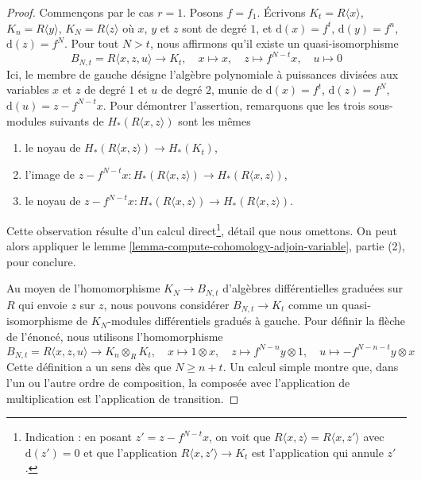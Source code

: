 \begin{proof}
Commençons par le cas $r = 1$. Posons $f = f_1$.
Écrivons $K_t = R\langle x \rangle$,
$K_n = R\langle y \rangle$, $K_N = R\langle z \rangle$
où $x$, $y$ et $z$ sont de degré $1$, et
$\text{d}(x) = f^t$, $\text{d}(y) = f^n$,
$\text{d}(z) = f^N$. Pour tout $N > t$, nous affirmons qu'il existe un quasi-isomorphisme
$$
B_{N, t} = R\langle x, z, u \rangle
\longrightarrow
K_t,\quad
x \mapsto x,\quad
z \mapsto f^{N - t}x,\quad
u \mapsto 0
$$
Ici, le membre de gauche désigne l'algèbre polynomiale à puissances divisées
aux variables $x$ et $z$ de degré $1$ et $u$ de degré $2$, munie de
$\text{d}(x) = f^t$, $\text{d}(z) = f^N$,
$\text{d}(u) = z - f^{N - t}x$. Pour démontrer
l'assertion, remarquons que les trois sous-modules suivants de
$H_*(R\langle x, z\rangle)$ sont les mêmes
\begin{enumerate}
\item le noyau de $H_*(R\langle x, z\rangle) \to H_*(K_t)$,
\item l'image de
$z - f^{N - t}x : H_*(R\langle x, z\rangle) \to H_*(R\langle x, z\rangle)$,
\item le noyau de
$z - f^{N - t}x : H_*(R\langle x, z\rangle) \to H_*(R\langle x, z\rangle)$.
\end{enumerate}
Cette observation résulte d'un calcul direct\footnote{Indication : en posant
$z' = z - f^{N - t}x$, on voit que
$R\langle x, z\rangle = R\langle x, z'\rangle$ avec $\text{d}(z') = 0$
et que l'application $R\langle x, z'\rangle\to K_t$ est
l'application qui annule $z'$.}, détail que nous omettons. On peut alors
appliquer le lemme \ref{lemma-compute-cohomology-adjoin-variable},
partie (2), pour conclure.

\medskip\noindent
Au moyen de l'homomorphisme $K_N \to B_{N, t}$ d'algèbres différentielles graduées sur $R$ qui
envoie $z$ sur $z$, nous pouvons considérer $B_{N, t} \to K_t$ comme un
quasi-isomorphisme de $K_N$-modules différentiels gradués à gauche. Pour définir la
flèche de l'énoncé, nous utilisons l'homomorphisme
$$
B_{N, t} = R\langle x, z, u \rangle\to K_n \otimes_R K_t,\quad
x \mapsto 1 \otimes x,\quad
z \mapsto f^{N - n}y \otimes 1,\quad
u \mapsto - f^{N - n - t}y \otimes x
$$
Cette définition a un sens dès que $N \geq n + t$. Un calcul
simple montre que, dans l'un ou l'autre ordre de composition, la composée avec
l'application de multiplication est l'application de transition.


\end{proof}
